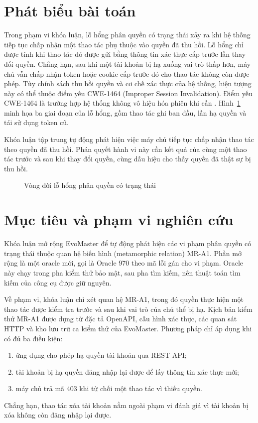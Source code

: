 \section{Phát biểu bài toán}
\label{sec:intro_problem}

Trong phạm vi khóa luận, lỗ hổng phân quyền có trạng thái xảy ra khi hệ thống tiếp tục chấp nhận một thao tác phụ thuộc vào quyền đã thu hồi. Lỗ hổng chỉ được tính khi thao tác đó được gửi bằng thông tin xác thực cấp trước lần thay đổi quyền. Chẳng hạn, sau khi một tài khoản bị hạ xuống vai trò thấp hơn, máy chủ vẫn chấp nhận token hoặc cookie cấp trước đó cho thao tác không còn được phép. Tùy chính sách thu hồi quyền và cơ chế xác thực của hệ thống, hiện tượng này có thể thuộc điểm yếu CWE-1464 (Improper Session Invalidation). Điểm yếu CWE-1464 là trường hợp hệ thống không vô hiệu hóa phiên khi cần \cite{cwe1464}. Hình~\ref{fig:stateful_authz_flaw} minh họa ba giai đoạn của lỗ hổng, gồm thao tác ghi ban đầu, lần hạ quyền và tái sử dụng token cũ.

Khóa luận tập trung tự động phát hiện việc máy chủ tiếp tục chấp nhận thao tác theo quyền đã thu hồi. Phán quyết hành vi này cần kết quả của cùng một thao tác trước và sau khi thay đổi quyền, cùng dấu hiệu cho thấy quyền đã thật sự bị thu hồi.

\begin{figure}[H]
  \centering
  
  \caption{Vòng đời lỗ hổng phân quyền có trạng thái}
  \label{fig:stateful_authz_flaw}
\end{figure}

\section{Mục tiêu và phạm vi nghiên cứu}
\label{sec:intro_objective}

Khóa luận mở rộng EvoMaster để tự động phát hiện các vi phạm phân quyền có trạng thái thuộc quan hệ biến hình (metamorphic relation) MR-A1. Phần mở rộng là một oracle mới, gọi là Oracle 970 theo mã lỗi gán cho vi phạm. Oracle này chạy trong pha kiểm thử bảo mật, sau pha tìm kiếm, nên thuật toán tìm kiếm của công cụ được giữ nguyên.

Về phạm vi, khóa luận chỉ xét quan hệ MR-A1, trong đó quyền thực hiện một thao tác được kiểm tra trước và sau khi vai trò của chủ thể bị hạ. Kịch bản kiểm thử MR-A1 được dựng từ đặc tả OpenAPI, cấu hình xác thực, các quan sát HTTP và kho lưu trữ ca kiểm thử của EvoMaster. Phương pháp chỉ áp dụng khi có đủ ba điều kiện:
\begin{enumerate}
    \item ứng dụng cho phép hạ quyền tài khoản qua REST API;
    \item tài khoản bị hạ quyền đăng nhập lại được để lấy thông tin xác thực mới;
    \item máy chủ trả mã 403 khi từ chối một thao tác vì thiếu quyền.
\end{enumerate}
Chẳng hạn, thao tác xóa tài khoản nằm ngoài phạm vi đánh giá vì tài khoản bị xóa không còn đăng nhập lại được.

